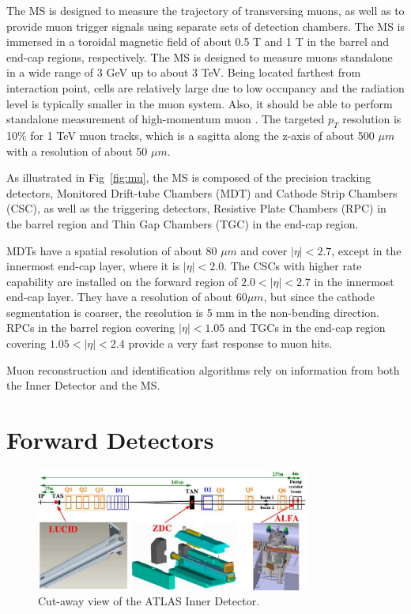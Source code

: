 \par The MS \cite{CERN-LHCC-97-022} is designed to measure the trajectory of transversing muons, as well as to provide muon trigger signals using separate sets of detection chambers. The MS is immersed in a toroidal magnetic field of about 0.5 T and 1 T in the barrel and end-cap regions, respectively. The MS is designed to measure muons standalone in a wide range of 3 GeV up to about 3 TeV. Being located farthest from interaction point, cells are relatively large due to low occupancy and the radiation level is typically smaller in the muon system. Also, it should be able to perform standalone measurement of high-momentum muon \cite{muon}.
The targeted $p_T$ resolution is 10\% for 1 TeV muon tracks, which is a sagitta along the z-axis of about 500 $\mu m$ with a resolution of about 50 $\mu m$.

\par As illustrated in Fig~\ref{fig:mu}, the MS is composed of the precision tracking detectors, Monitored Drift-tube Chambers (MDT) and Cathode Strip Chambers (CSC), as well as the triggering detectors, Resistive Plate Chambers (RPC) in the barrel region and Thin Gap Chambers (TGC) in the end-cap region.

\par MDTs have a spatial resolution of about 80 $\mu m$ and cover $|\eta| < 2.7$, except in the innermost end-cap layer, where it is $|\eta| < 2.0$. The CSCs with higher rate capability are installed on the forward region of $2.0 < |\eta| < 2.7$ in the innermost end-cap layer. They have a resolution of about 60$\mu m$, but since the cathode segmentation is coarser, the resolution is 5 mm in the non-bending direction. RPCs in the barrel region covering $|\eta| < 1.05$ and TGCs in the end-cap region covering $1.05 < |\eta| < 2.4$ provide a very fast response to muon hits.

\par Muon reconstruction and identification algorithms rely on information from both the Inner Detector and the MS.

\section{Forward Detectors}
\label{sec:for}
\begin{figure}[htbp]
    \centering
    \includegraphics[width=0.8\textwidth]{chapters/c4/figures/forward}
    \caption{Cut-away view of the ATLAS Inner Detector.}
    \label{fig:forward}
\end{figure}


